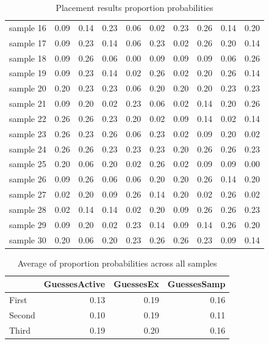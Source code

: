 \begin{table}
\begin{tabular}{|l|rrr|rrr|rrr|}
sample 16 &          0.09 &  0.14 &  0.23 &      0.06 &  0.02 &  0.23 &        0.26 &  0.14 &  0.20 \\
sample 17 &          0.09 &  0.23 &  0.14 &      0.06 &  0.23 &  0.02 &        0.26 &  0.20 &  0.14 \\
sample 18 &          0.09 &  0.26 &  0.06 &      0.00 &  0.09 &  0.09 &        0.09 &  0.06 &  0.26 \\
sample 19 &          0.09 &  0.23 &  0.14 &      0.02 &  0.26 &  0.02 &        0.20 &  0.26 &  0.14 \\
sample 20 &          0.20 &  0.23 &  0.23 &      0.06 &  0.20 &  0.20 &        0.20 &  0.23 &  0.23 \\
sample 21 &          0.09 &  0.20 &  0.02 &      0.23 &  0.06 &  0.02 &        0.14 &  0.20 &  0.26 \\
sample 22 &          0.26 &  0.26 &  0.23 &      0.20 &  0.02 &  0.09 &        0.14 &  0.02 &  0.14 \\
sample 23 &          0.26 &  0.23 &  0.26 &      0.06 &  0.23 &  0.02 &        0.09 &  0.20 &  0.02 \\
sample 24 &          0.26 &  0.26 &  0.23 &      0.23 &  0.23 &  0.20 &        0.26 &  0.26 &  0.23 \\
sample 25 &          0.20 &  0.06 &  0.20 &      0.02 &  0.26 &  0.02 &        0.09 &  0.09 &  0.00 \\
sample 26 &          0.09 &  0.26 &  0.06 &      0.06 &  0.20 &  0.20 &        0.26 &  0.14 &  0.20 \\
sample 27 &          0.02 &  0.20 &  0.09 &      0.26 &  0.14 &  0.20 &        0.02 &  0.26 &  0.02 \\
sample 28 &          0.02 &  0.14 &  0.14 &      0.02 &  0.20 &  0.09 &        0.26 &  0.26 &  0.23 \\
sample 29 &          0.09 &  0.20 &  0.02 &      0.23 &  0.14 &  0.09 &        0.14 &  0.26 &  0.20 \\
sample 30 &          0.20 &  0.06 &  0.20 &      0.23 &  0.26 &  0.26 &        0.23 &  0.09 &  0.14 \\
\bottomrule
\end{tabular}
\caption{Placement results proportion probabilities}
\end{table}


\begin{table}
\begin{tabular}{lrrr}
\toprule
{} &  GuessesActive &  GuessesEx &  GuessesSamp \\
\midrule
First  &        0.13 &       0.19 &         0.16 \\
Second &        0.10 &       0.19 &         0.11 \\
Third  &        0.19 &       0.20 &         0.16 \\
\bottomrule
\end{tabular}
\caption{Average of proportion probabilities across all samples}
\end{table}

